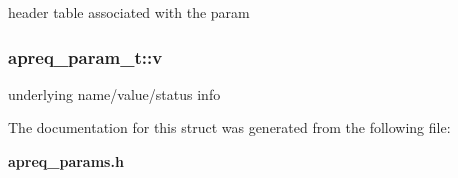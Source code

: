 header table associated with the param 
\subsubsection{ apreq\_\-param\_\-t::v}\label{structapreq__param__t_m2}


underlying name/value/status info 

The documentation for this struct was generated from the following file:\begin{CompactItemize}
\item 
{\bf apreq\_\-params.h}\end{CompactItemize}
